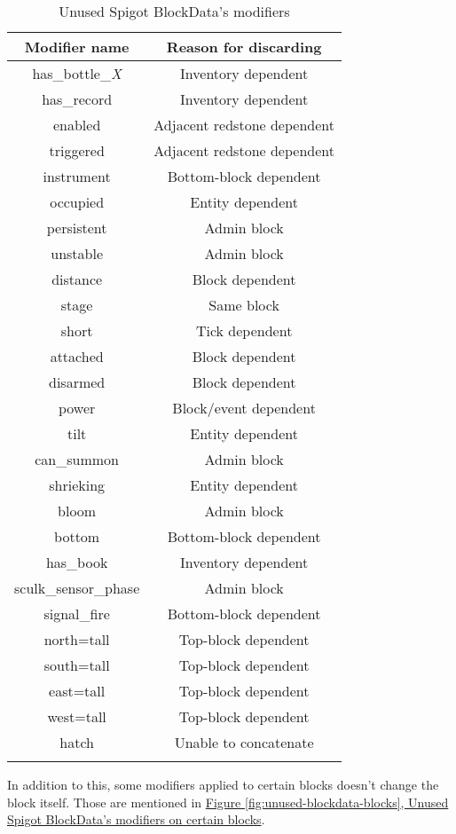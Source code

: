 \begin{longtable}{ |c|c| }
	\hline
	Modifier name & Reason for discarding \\
	\hline
	\endhead
	has\_bottle\_\textit{X} & Inventory dependent \\
	has\_record & Inventory dependent \\
	enabled & Adjacent redstone dependent \\
	triggered & Adjacent redstone dependent \\
	instrument & Bottom-block dependent \\
	occupied & Entity dependent \\
	persistent & Admin block \\
	unstable & Admin block \\
	distance & Block dependent \\
	stage & Same block \\
	short & Tick dependent \\
	attached & Block dependent \\
	disarmed & Block dependent \\
	power & Block/event dependent \\
	tilt & Entity dependent \\
	can\_summon & Admin block \\
	shrieking & Entity dependent \\
	bloom & Admin block \\
	bottom & Bottom-block dependent \\
	has\_book & Inventory dependent \\
	sculk\_sensor\_phase & Admin block \\
	signal\_fire & Bottom-block dependent \\
	north=tall & Top-block dependent \\
	south=tall & Top-block dependent \\
	east=tall & Top-block dependent \\
	west=tall & Top-block dependent \\
	hatch & Unable to concatenate \\
	\hline
	
	\caption{Unused Spigot BlockData's modifiers}
	\label{fig:unused-blockdata}
\end{longtable}

In addition to this, some modifiers applied to certain blocks doesn't change the block itself. Those are mentioned in \hyperref[fig:unused-blockdata-blocks]{Figure \ref{fig:unused-blockdata-blocks}, Unused Spigot BlockData's modifiers on certain blocks}.


